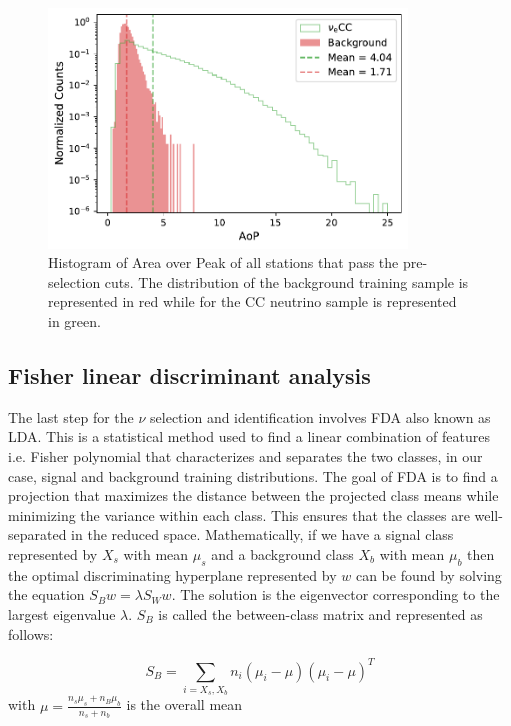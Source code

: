 \begin{figure}[h!]
  \centering
  \includegraphics[width=0.85\textwidth]{thesis_figures/Nu_analysis/Selection_Evo_AoP_hist_wnt_redcut.pdf}
  \caption{Histogram of Area over Peak of all stations that pass the pre-selection cuts. The distribution of the background training sample is represented in red while for the CC neutrino sample is represented in green.}
  \label{fig:AoP_hist}
\end{figure}

\subsection{Fisher linear discriminant analysis}
\label{subsec:nu_sel_fisher}
The last step for the $\nu$ selection and identification involves \gls{FDA} also known as \gls{LDA}. This is a statistical method used to find a linear combination of features i.e. Fisher polynomial that characterizes and separates the two classes, in our case, signal and background training distributions. The goal of FDA is to find a projection that maximizes the distance between the projected class means while minimizing the variance within each class. This ensures that the classes are well-separated in the reduced space. Mathematically, if we have a signal class represented by $X_s$ with mean $\mu_s$ and a background class $X_b$ with mean $\mu_b$ then the optimal discriminating hyperplane represented by $w$ can be found by solving the equation $S_{B} w = \lambda S_{W} w$. The solution is the eigenvector corresponding to the largest eigenvalue $\lambda$. $S_{B}$ is called the between-class matrix and represented as follows: 

\begin{equation}
  S_{B} = \sum_{i = X_s,X_b} n_i (\mu_i - \mu)(\mu_i - \mu)^T
\end{equation}
with $\mu = \frac{n_s \mu_s + n_B \mu_b}{n_s + n_b}$ is the overall mean 


